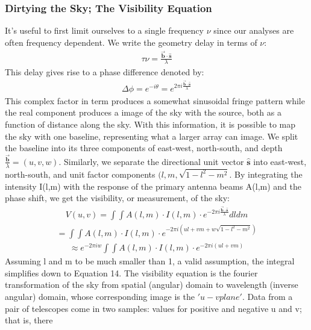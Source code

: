 \documentclass{article}
\begin{document}
\subsubsection{Dirtying the Sky; The Visibility Equation}
It's useful to first limit ourselves to a single frequency $\nu$ since
our analyses are often frequency dependent. We write the geometry delay
in terms of $\nu$:
\begin{align}\tau\nu =
  \frac{\overrightarrow{\textbf{b}}\cdot\hat{\textbf{s}}}{\lambda}
\end{align}
This delay gives rise to a phase difference denoted by:
\begin{align}\Delta\phi = e^{-i\theta} =
  e^{2\pi{i}\frac{\overrightarrow{\textbf{b}}\cdot\hat{\textbf{s}}}{\lambda}}
\end{align}
This complex factor in term produces a somewhat sinusoidal fringe
pattern while the real component produces a image of the sky with the
source, both as a function of distance along the sky. With this
information, it is possible to map the sky with one baseline,
representing what a larger array can image. We split the baseline into
its three components of east-west, north-south, and depth
$\frac{\overrightarrow{\textbf{b}}}{\lambda} = (u,v,w)$. Similarly, we
separate the directional unit vector $\hat{\textbf{s}}$ into east-west,
north-south, and unit factor components $(l,m,\sqrt{1-l^{2}-m^{2}}$. By
integrating the intensity I(l,m) with the response of the primary
antenna beams A(l,m) and the phase shift, we get the visibility, or
measurement, of the sky: 
\begin{align}V(u,v) = \int\int{A(l,m)\cdot{I(l,m)}\cdot
    {e^{-2\pi{i}\frac{\overrightarrow{\textbf{b}}\cdot\hat{\textbf{s}}}{\lambda}}}dldm}
\end{align}
\begin{align}= \int\int{A(l,m)\cdot{I(l,m)}\cdot
    {e^{-2\pi{i}(ul+vm+w\sqrt{1-l^{2}-m^{2}})}}}
\end{align}
\begin{align}\approx e^{-2\pi{i}w}\int\int{A(l,m)\cdot{I(l,m)}\cdot
    {e^{-2\pi{i}(ul+vm)}}}
\end{align}
Assuming l and m to be much smaller than 1, a valid assumption, the
integral simplifies down to Equation 14. The visibility equation is the
fourier transformation of the sky from spatial (angular) domain to
wavelength (inverse angular) domain, whose corresponding image is the
$'u-v plane'$. Data from a pair of telescopes come
in two samples: values for positive and negative u and v; that is, there
\end{document}

